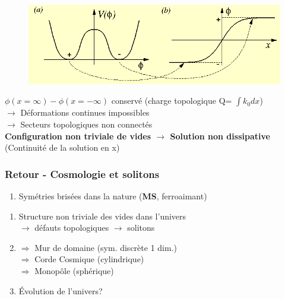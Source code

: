 \documentclass[handout]{beamer}
\begin{document}
\begin{frame}

\begin{figure}
\includegraphics[scale=0.4]{soli_def.png}
\end{figure}
$\phi(x=\infty)- \phi(x=-\infty)$ conservé (charge topologique Q= $\int{k_0 dx}$)
\\$\rightarrow$ Déformations continues impossibles
\\$\rightarrow$ Secteurs topologiques non connectés\\[0.5 cm]

\textbf{Configuration non triviale de vides $\rightarrow$ Solution non dissipative}\\
(Continuité de la solution en x)



\end{frame}

\begin{frame}\frametitle{Retour - Cosmologie et solitons}
\begin{enumerate}
\item Symétries brisées dans la nature (\textbf{MS}, ferroaimant)
\end{enumerate}
\begin{enumerate}
\item Structure non triviale des vides dans l'univers\\
$\rightarrow$ défauts topologiques $\rightarrow$ solitons
\item $\Rightarrow$ Mur de domaine (sym. discrète 1 dim.)\\$\Rightarrow$ Corde Cosmique (cylindrique)\\$\Rightarrow$ Monopôle (sphérique)
\item Évolution de l'univers?
\end{enumerate}



\end{frame}
\end{document}
